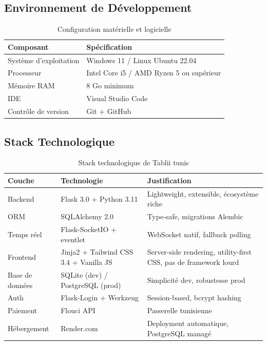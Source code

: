\documentclass[12pt,a4paper]{report}
\begin{document}
\subsection{Environnement de Développement}

\begin{table}[H]
    \centering
    \begin{tabularx}{\textwidth}{l X}
        \toprule
        \rowcolor{primary!10}
        \textbf{Composant} & \textbf{Spécification} \\
        \midrule
        Système d'exploitation & Windows 11 / Linux Ubuntu 22.04 \\
        Processeur & Intel Core i5 / AMD Ryzen 5 ou supérieur \\
        Mémoire RAM & 8 Go minimum \\
        IDE & Visual Studio Code \\
        Contrôle de version & Git + GitHub \\
        \bottomrule
    \end{tabularx}
    \caption{Configuration matérielle et logicielle}
    \label{tab:env}
\end{table}

\subsection{Stack Technologique}

\begin{table}[H]
    \centering
    \begin{tabularx}{\textwidth}{l l X}
        \toprule
        \rowcolor{primary!10}
        \textbf{Couche} & \textbf{Technologie} & \textbf{Justification} \\
        \midrule
        Backend & Flask 3.0 + Python 3.11 & Lightweight, extensible, écosystème riche \\
        ORM & SQLAlchemy 2.0 & Type-safe, migrations Alembic \\
        Temps réel & Flask-SocketIO + eventlet & WebSocket natif, fallback polling \\
        Frontend & Jinja2 + Tailwind CSS 3.4 + Vanilla JS & Server-side rendering, utility-first CSS, pas de framework lourd \\
        Base de données & SQLite (dev) / PostgreSQL (prod) & Simplicité dev, robustesse prod \\
        Auth & Flask-Login + Werkzeug & Session-based, bcrypt hashing \\
        Paiement & Flouci API & Passerelle tunisienne \\
        Hébergement & Render.com & Deployment automatique, PostgreSQL managé \\
        \bottomrule
    \end{tabularx}
    \caption{Stack technologique de Tablii tunis}
    \label{tab:techstack}
\end{table}
\end{document}
